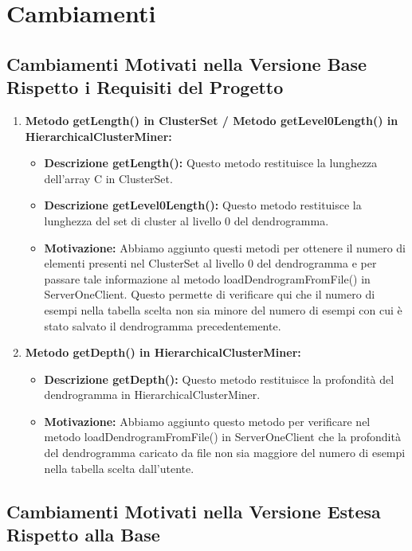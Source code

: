
\section{Cambiamenti}

\subsection{Cambiamenti Motivati nella Versione Base Rispetto i Requisiti del Progetto}

\begin{enumerate}
    \item \textbf{Metodo getLength() in ClusterSet / Metodo getLevel0Length() in HierarchicalClusterMiner:}
    \begin{itemize}
        \item \textbf{Descrizione getLength():} Questo metodo restituisce la lunghezza dell'array C in ClusterSet.
        \item \textbf{Descrizione getLevel0Length():} Questo metodo restituisce la lunghezza del set di cluster al livello 0 del dendrogramma.
        \item \textbf{Motivazione:} Abbiamo aggiunto questi metodi per ottenere il numero di elementi presenti nel ClusterSet al livello 0 del dendrogramma e per passare tale informazione al metodo loadDendrogramFromFile() in ServerOneClient. Questo permette di verificare qui che il numero di esempi nella tabella scelta non sia minore del numero di esempi con cui è stato salvato il dendrogramma precedentemente.
    \end{itemize}
    
    \item \textbf{Metodo getDepth() in HierarchicalClusterMiner:}
    \begin{itemize}
        \item \textbf{Descrizione getDepth():} Questo metodo restituisce la profondità del dendrogramma in HierarchicalClusterMiner.
        \item \textbf{Motivazione:} Abbiamo aggiunto questo metodo per verificare nel metodo loadDendrogramFromFile() in ServerOneClient che la profondità del dendrogramma caricato da file non sia maggiore del numero di esempi nella tabella scelta dall'utente.
    \end{itemize}
\end{enumerate}

\subsection{Cambiamenti Motivati nella Versione Estesa Rispetto alla Base}

